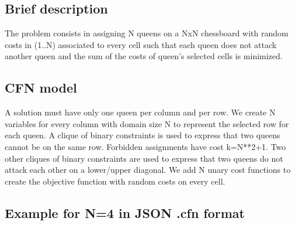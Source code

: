 \documentclass[letterpaper,10pt,openany,oneside,english]{sphinxmanual}
\let\sphinxpxdimen\pdfpxdimen\else\newdimen\sphinxpxdimen
\begin{document}
\subsection{Brief description}
\label{\detokenize{examples/tuto_wnqp:brief-description}}
\sphinxAtStartPar
The problem consists in assigning N queens on a NxN chessboard with random costs in (1..N) associated to every cell such that each queen does not attack another queen and the sum of the costs of queen’s selected cells is minimized.


\subsection{CFN model}
\label{\detokenize{examples/tuto_wnqp:cfn-model}}
\sphinxAtStartPar
A solution must have only one queen per column and per row. We create N variables for every column with domain size N to represent the selected row for each queen. A clique of binary constraints is used to express that two queens cannot be on the same row. Forbidden assignments have cost k=N**2+1. Two other cliques of binary constraints are used to express that two queens do not attack each other on a lower/upper diagonal. We add N unary cost functions to create the objective function with random costs on every cell.


\subsection{Example for N=4 in JSON .cfn format}
\label{\detokenize{examples/tuto_wnqp:example-for-n-4-in-json-cfn-format}}
\sphinxAtStartPar
{}

\noindent\sphinxincludegraphics[width=250\sphinxpxdimen]{{queen4_details}.png}
\end{document}
